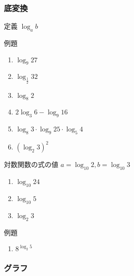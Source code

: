 \documentclass[10pt,dvipdfmx]{jsarticle}
\begin{document}
\subsubsection*{底変換}
定義 $\log_{a}b$
\vspace{8mm}
\begin{itembox}[l]{例題}
  \begin{multicols}{3}
    \begin{large}
      \begin{enumerate}
        \item $\log_{9}27$
        \item $\log_{\frac{1}{2}}32$
        \item $\log_{8}2$
        \item $2\log_{3}6-\log_{9}16$
        \item $\log_{8}3\cdot\log_{9}25\cdot\log_{5}4$
        \item $(\log_{2}3)^2$
      \end{enumerate}
    \end{large}
  \end{multicols}
\end{itembox}

\begin{itembox}[l]{対数関数の式の値}
  $a=\log_{10}2, b=\log_{10}3$
  \begin{multicols}{3}
    \begin{large}
      \begin{enumerate}
        \item $\log_{10}24$
        \item $\log_{10}5$
        \item $\log_{2}3$
      \end{enumerate}
    \end{large}
  \end{multicols}
\end{itembox}

\begin{itembox}[l]{例題}
  \begin{multicols}{2}
    \begin{large}
      \begin{enumerate}
        \item $8^{\log_{2}5}$
      \end{enumerate}
    \end{large}
  \end{multicols}
\end{itembox}

\subsubsection*{グラフ}
\end{document}
